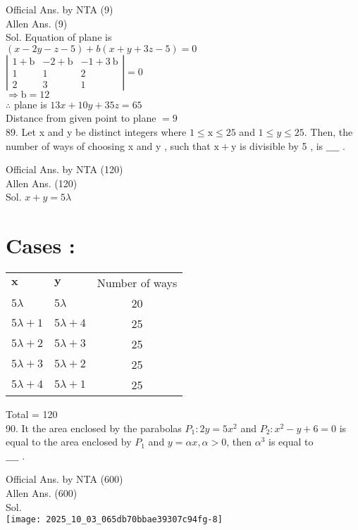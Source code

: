\documentclass[10pt]{article}
\begin{document}
Official Ans. by NTA (9)\\
Allen Ans. (9)\\
Sol. Equation of plane is\\
\((x-2 y-z-5)+b(x+y+3 z-5)=0\)\\
\(\left|\begin{array}{lll}1+\mathrm{b} & -2+\mathrm{b} & -1+3 \mathrm{~b} \\ 1 & 1 & 2 \\ 2 & 3 & 1\end{array}\right|=0\)\\
\(\Rightarrow \mathrm{b}=12\)\\
\(\therefore\) plane is \(13 x+10 y+35 z=65\)\\
Distance from given point to plane \(=9\)\\
89. Let x and y be distinct integers where \(1 \leq \mathrm{x} \leq 25\) and \(1 \leq y \leq 25\). Then, the number of ways of choosing x and y , such that \(\mathrm{x}+\mathrm{y}\) is divisible by 5 , is \(\_\_\_\_\) .

Official Ans. by NTA (120)\\
Allen Ans. (120)\\
Sol. \(x+y=5 \lambda\)

\section*{Cases :}
\begin{center}
\begin{tabular}{llc}
\(\mathbf{x}\) & \(\mathbf{y}\) & Number of ways \\
\(5 \lambda\) & \(5 \lambda\) & 20 \\
\(5 \lambda+1\) & \(5 \lambda+4\) & 25 \\
\(5 \lambda+2\) & \(5 \lambda+3\) & 25 \\
\(5 \lambda+3\) & \(5 \lambda+2\) & 25 \\
\(5 \lambda+4\) & \(5 \lambda+1\) & 25 \\
\end{tabular}
\end{center}

Total = 120\\
90. It the area enclosed by the parabolas \(P_{1}: 2 y=5 x^{2}\) and \(P_{2}: x^{2}-y+6=0\) is equal to the area enclosed by \(P_{1}\) and \(y=\alpha x, \alpha>0\), then \(\alpha^{3}\) is equal to\\
\(\_\_\_\_\) .

Official Ans. by NTA (600)\\
Allen Ans. (600)\\
Sol.\\
\texttt{[image: 2025\_10\_03\_065db70bbae39307c94fg-8]}
\end{document}
